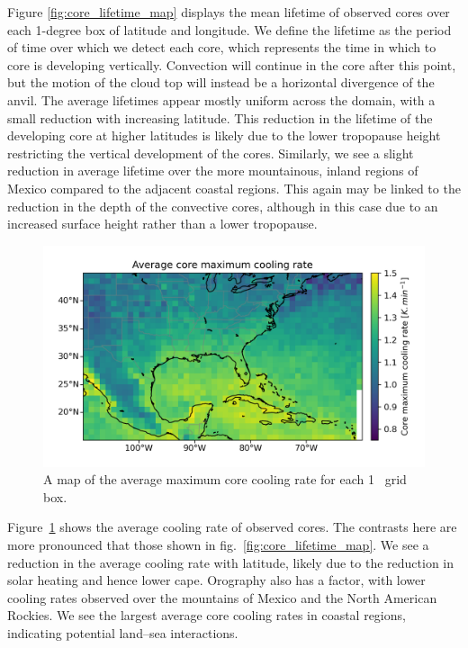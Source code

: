 Figure \ref{fig:core_lifetime_map} displays the mean lifetime of observed cores over each 1-degree box of latitude and longitude.
We define the lifetime as the period of time over which we detect each core, which represents the time in which to core is developing vertically.
Convection will continue in the core after this point, but the motion of the cloud top will instead be a horizontal divergence of the anvil.
The average lifetimes appear mostly uniform across the domain, with a small reduction with increasing latitude.
This reduction in the lifetime of the developing core at higher latitudes is likely due to the lower tropopause height restricting the vertical development of the cores.
Similarly, we see a slight reduction in average lifetime over the more mountainous, inland regions of Mexico compared to the adjacent coastal regions.
This again may be linked to the reduction in the depth of the convective cores, although in this case due to an increased surface height rather than a lower tropopause.


\begin{figure}[tp]
    \centering
    \includegraphics[width=\textwidth]{figures/chapter2_07.png}
    \caption[
    A map of the average maximum core cooling rate for each 1
    \textdegree\ grid box
    ]{
    A map of the  average maximum core cooling rate for each 1
    \textdegree\ grid box.
    }
    \label{fig:core_cooling_rate_map}
\end{figure}

Figure~\ref{fig:core_cooling_rate_map} shows the average cooling rate of observed cores.
The contrasts here are more pronounced that those shown in fig.~\ref{fig:core_lifetime_map}.
We see a reduction in the average cooling rate with latitude, likely due to the reduction in solar heating and hence lower \acrshort{cape}.
Orography also has a factor, with lower cooling rates observed over the mountains of Mexico and the North American Rockies.
We see the largest average core cooling rates in coastal regions, indicating potential land--sea interactions.

